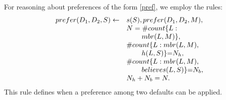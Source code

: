 \documentclass{article}
\newcommand{\memo}[1]{
  \ifthenelse {\boolean{includeMemo}}{\medskip\noindent\fbox{\begin{minipage}[b]{\dimexpr\linewidth-1em}#1\end{minipage}}\medskip\newline} 
}
\begin{document}
 \setcounter{equation}{13}
 
 For reasoning about preferences of the form \eqref{pref}, we employ the rules:
% 
{
\begin{equation}\label{lp:pref}
\begin{array}{ll}
prefer(D_1, D_2, S) \leftarrow &  s(S),   prefer(D_1, D_2, M),   \\
     & N  = \# count \{L : \\
     &  \hspace*{.3in} mbr(L, M)\},  \\ 
     & \# count \{L : mbr(L, M),  \\
     &  \hspace*{.3in}  h(L, S) \} {=} N_h, \\
     & \# count \{L : mbr(L, M), \\
     & \hspace*{.3in} believes(L, S) \} {=} N_b, \\
     & N_h+N_b=N.
      \end{array}
\end{equation} 
}
%
This rule defines when a preference among two defaults can be applied. 
%
%
%
% 
%
%
%
%
%
\end{document}
